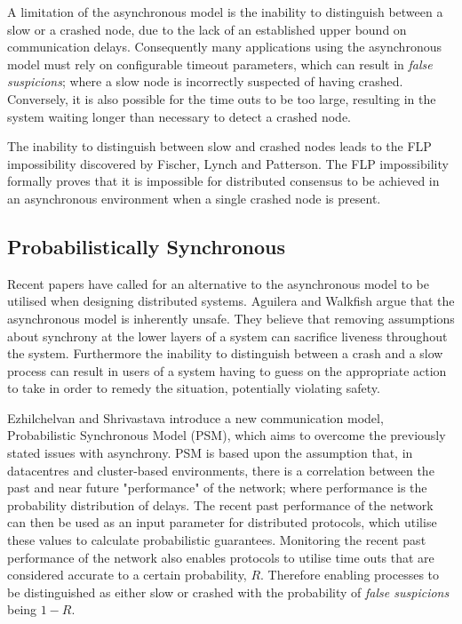 	A limitation of the asynchronous model is the inability to distinguish between a slow or a crashed node, due to the lack of an established upper bound on communication delays.  Consequently many applications using the asynchronous model must rely on configurable timeout parameters, which can result in \emph{false suspicions}; where a slow node is incorrectly suspected of having crashed.  Conversely, it is also possible for the time outs to be too large, resulting in the system waiting longer than necessary to detect a crashed node.  
	
	The inability to distinguish between slow and crashed nodes leads to the FLP impossibility discovered by Fischer, Lynch and Patterson\citep{Fischer:1985:IDC:3149.214121}.  The FLP impossibility formally proves that it is impossible for distributed consensus to be achieved in an asynchronous environment when a single crashed node is present. 
	
	\subsection{Probabilistically Synchronous}\label{ssec:probabilistically_synchronous}
	Recent papers have called for an alternative to the asynchronous model to be utilised when designing distributed systems. Aguilera and Walkfish\citep{Aguilera:2009:NTA:1855568.1855571} argue that the asynchronous model is inherently unsafe. They believe that removing assumptions about synchrony at the lower layers of a system can sacrifice liveness throughout the system. Furthermore the inability to distinguish between a crash and a slow process can result in users of a system having to guess on the appropriate action to take in order to remedy the situation, potentially violating safety. 

Ezhilchelvan and Shrivastava\citep{Ezhilchelvan:2010:LPR:1773912.1773927} introduce a new communication model, Probabilistic Synchronous Model (PSM), which aims to overcome the previously stated issues with asynchrony. PSM is based upon the assumption that, in datacentres and cluster-based environments, there is a correlation between the past and near future "performance" of the network; where performance is the probability distribution of delays.  The recent past performance of the network can then be used as an input parameter for distributed protocols, which utilise these values to calculate probabilistic guarantees. Monitoring the recent past performance of the network also enables protocols to utilise time outs that are considered accurate to a certain probability, $R$.  Therefore enabling processes to be distinguished as either slow or crashed with the probability of \emph{false suspicions} being $1 - R$.  

